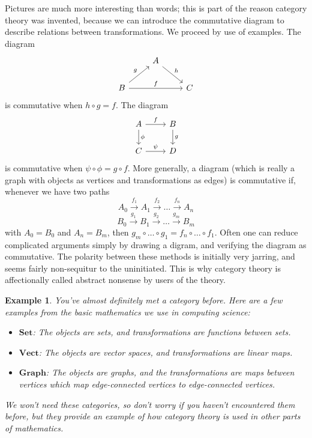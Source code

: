 \documentclass{article}
\theoremstyle{plain}
\newtheorem*{example}{Example}
\begin{document}
Pictures are much more interesting than words; this is part of the reason category theory was invented, because we can introduce the commutative diagram to describe relations between transformations. We proceed by use of examples. The diagram
%
\[
\begin{tikzcd}
     & A \arrow{rd}{h} & \\
    B \arrow{ru}{g} \arrow{rr}{f} & & C
\end{tikzcd}
\]
%
is commutative when $h \circ g = f$. The diagram
%
\[
\begin{tikzcd}
    A \arrow{d}{\phi} \arrow{r}{f} & B \arrow{d}{g}\\
    C \arrow{r}{\psi} & D
\end{tikzcd}
\]
%
is commutative when $\psi \circ \phi = g \circ f$. More generally, a diagram (which is really a graph with objects as vertices and transformations as edges) is commutative if, whenever we have two paths
%
\[ A_0 \xrightarrow{f_1} A_1 \xrightarrow{f_2} \dots \xrightarrow{f_n} A_n \]
\[ B_0 \xrightarrow{g_1} B_1 \xrightarrow{g_2} \dots \xrightarrow{g_m} B_m \]
%
with $A_0 = B_0$ and $A_n = B_m$, then $g_m \circ \dots \circ g_1 = f_n \circ \dots \circ f_1$. Often one can reduce complicated arguments simply by drawing a digram, and verifying the diagram as commutative. The polarity between these methods is initially very jarring, and seems fairly non-sequitur to the uninitiated. This is why category theory is affectionally called abstract nonsense by users of the theory.

\begin{example}
    You've almost definitely met a category before. Here are a few examples from the basic mathematics we use in computing science:
    \begin{itemize}
        \item $\mathbf{Set}$: The objects are sets, and transformations are functions between sets.
        \item $\mathbf{Vect}$: The objects are vector spaces, and transformations are linear maps.
        \item $\mathbf{Graph}$: The objects are graphs, and the transformations are maps between vertices which map edge-connected vertices to edge-connected vertices.
    \end{itemize}
    We won't need these categories, so don't worry if you haven't encountered them before, but they provide an example of how category theory is used in other parts of mathematics.
\end{example}
\end{document}
